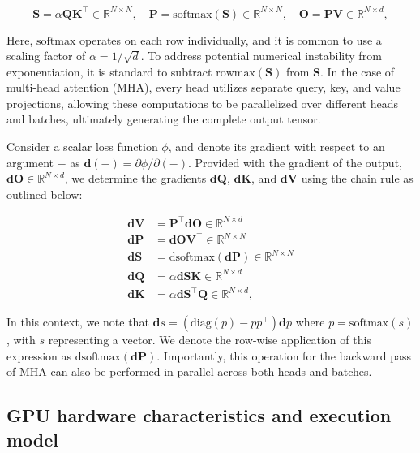 \begin{equation*}
  \mathbf{S} = \alpha \mathbf{Q} \mathbf{K}^\top \in \mathbb{R}^{N \times N}, \quad \mathbf{P} = \mathrm{softmax}(\mathbf{S}) \in \mathbb{R}^{N \times N}, \quad \mathbf{O} = \mathbf{P}\mathbf{V} \in \mathbb{R}^{N \times d},
\end{equation*}

Here, $\mathrm{softmax}$ operates on each row individually, and it is common to use a scaling factor of $\alpha = 1/\sqrt{d}$. To address potential numerical instability from exponentiation, it is standard to subtract $\mathrm{rowmax}(\mathbf{S})$ from $\mathbf{S}$. In the case of multi-head attention (MHA), every head utilizes separate query, key, and value projections, allowing these computations to be parallelized over different heads and batches, ultimately generating the complete output tensor.

Consider a scalar loss function $\phi$, and denote its gradient with respect to an argument $-$ as $\mathbf{d}(-) = \partial \phi / \partial (-)$. Provided with the gradient of the output, $\mathbf{dO} \in \mathbb{R}^{N \times d}$, we determine the gradients $\mathbf{dQ}$, $\mathbf{dK}$, and $\mathbf{dV}$ using the chain rule as outlined below:

\begin{align*}
  \mathbf{dV} &= \mathbf{P}^\top \mathbf{dO} \in \mathbb{R}^{N \times d} \\
  \mathbf{dP} &= \mathbf{dO} \mathbf{V}^\top \in \mathbb{R}^{N \times N} \\
  \mathbf{dS} &= \mathrm{dsoftmax} (\mathbf{dP}) \in \mathbb{R}^{N \times N} \\
  \mathbf{dQ} &= \alpha \mathbf{dS} \mathbf{K} \in \mathbb{R}^{N \times d} \\
  \mathbf{dK} &= \alpha \mathbf{dS}^\top \mathbf{Q} \in \mathbb{R}^{N \times d},
\end{align*}

In this context, we note that $\mathbf{d}s = (\mathrm{diag}(p) - p p^\top)\mathbf{d}p$ where $p = \mathrm{softmax}(s)$, with $s$ representing a vector. We denote the row-wise application of this expression as $\mathrm{dsoftmax}(\mathbf{dP})$. Importantly, this operation for the backward pass of MHA can also be performed in parallel across both heads and batches.

\subsection{GPU hardware characteristics and execution model}
\label{subsec:hardware}

